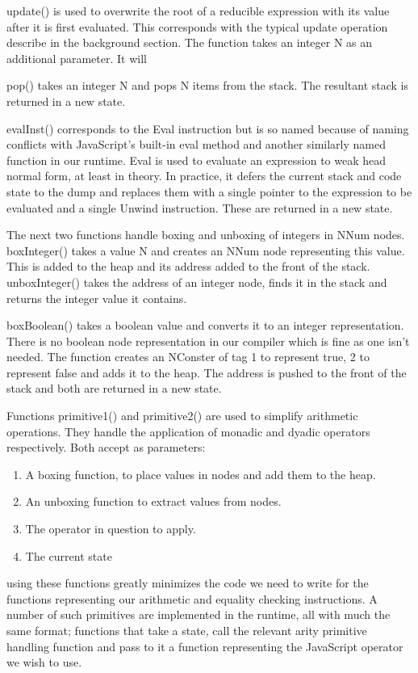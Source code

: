 update() is used to overwrite the root of a reducible expression
with its value after it is first evaluated. This corresponds
with the typical update operation describe in the background
section. The function takes an integer N as an additional
parameter. It will 

pop() takes an integer N and pops N items from the stack.
The resultant stack is returned in a new state.

evalInst() corresponds to the Eval instruction but is so named
because of naming conflicts with JavaScript's built-in eval
method and another similarly named function in our runtime.
Eval is used to evaluate an expression to weak head normal
form, at least in theory. In practice, it defers the current
stack and code state to the dump and replaces them with a
single pointer to the expression to be evaluated and a single
Unwind instruction. These are returned in a new state.

The next two functions handle boxing and unboxing of integers
in NNum nodes. boxInteger() takes a value N and creates an
NNum node representing this value. This is added to the heap
and its address added to the front of the stack. unboxInteger()
takes the address of an integer node, finds it in the stack
and returns the integer value it contains. 

boxBoolean() takes a boolean value and converts it to an
integer representation. There is no boolean node representation
in our compiler which is fine as one isn't needed. The function
creates an NConster of tag 1 to represent true, 2 to represent 
false and adds it to the heap. The address is pushed to the
front of the stack and both are returned in a new state.

Functions primitive1() and primitive2() are used to simplify
arithmetic operations. They handle the application of monadic
and dyadic operators respectively. Both accept as parameters:

\begin{enumerate}
    \item A boxing function, to place values in nodes and
          add them to the heap.
    \item An unboxing function to extract values from nodes.
    \item The operator in question to apply.
    \item The current state
\end{enumerate}

\noindent using these functions greatly minimizes the code we
need to write for the functions representing our arithmetic and
equality checking instructions. A number of such primitives
are implemented in the runtime, all with much the same format;
functions that take a state, call the relevant arity primitive 
handling function and pass to it a function representing the 
JavaScript operator we wish to use. 

